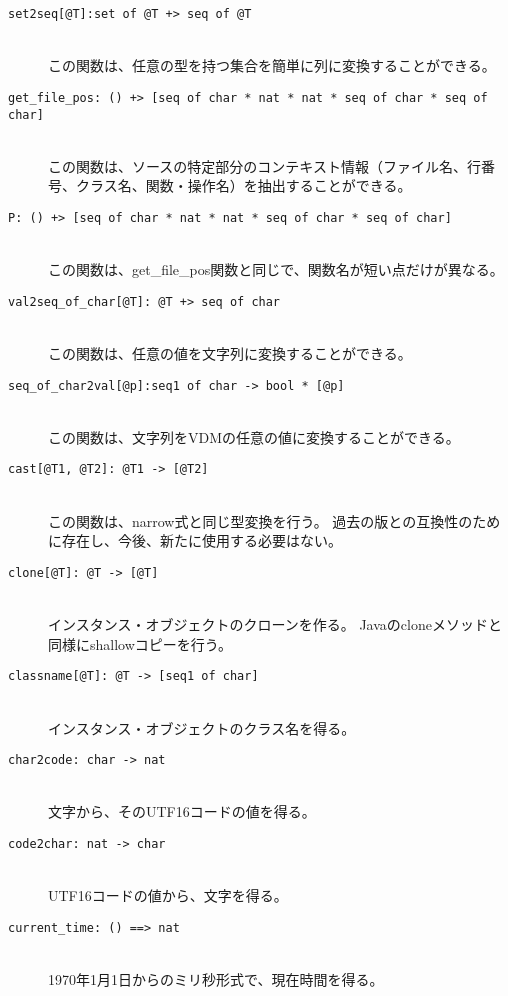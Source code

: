 \documentclass[\pformat,12pt]{jarticle}
\begin{document}
\begin{description}
\item[\texttt{set2seq[@T]:set of @T +> seq of @T}] \mbox{}\\
この関数は、任意の型を持つ集合を簡単に列に変換することができる。

\item[\texttt{get\_file\_pos: () +> [seq of char * nat
* nat * seq of char * seq of char]}] \mbox{}\\
この関数は、ソースの特定部分のコンテキスト情報（ファイル名、行番号、クラス名、関数・操作名）を抽出することができる。

\item[\texttt{P: () +> [seq of char * nat
* nat * seq of char * seq of char]}] \mbox{}\\
この関数は、get\_file\_pos関数と同じで、関数名が短い点だけが異なる。

\item[\texttt{val2seq\_of\_char[@T]: @T +> seq of char}] \mbox{}\\
この関数は、任意の値を文字列に変換することができる。

\item[\texttt{seq\_of\_char2val[@p]:seq1 of char -> bool * [@p]}] \mbox{}\\
この関数は、文字列をVDMの任意の値に変換することができる。

\item[\texttt{cast[@T1, @T2]: @T1 -> [@T2]}] \mbox{}\\
この関数は、narrow式と同じ型変換を行う。
過去の版との互換性のために存在し、今後、新たに使用する必要はない。

\item[\texttt{clone[@T]: @T -> [@T]}] \mbox{}\\
インスタンス・オブジェクトのクローンを作る。
Javaのcloneメソッドと同様にshallowコピーを行う。

\item[\texttt{classname[@T]: @T -> [seq1 of char]}] \mbox{}\\
インスタンス・オブジェクトのクラス名を得る。

\item[\texttt{char2code: char -> nat}] \mbox{}\\
文字から、そのUTF16コードの値を得る。

\item[\texttt{code2char: nat -> char}] \mbox{}\\
UTF16コードの値から、文字を得る。

\item[\texttt{current\_time: () ==> nat}] \mbox{}\\
1970年1月1日からのミリ秒形式で、現在時間を得る。

\end{description}
\end{document}
